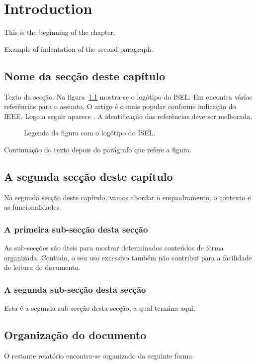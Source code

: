 %
%
\chapter{Introduction} \label{cap:intro}

This is the beginning of the chapter.

Example of indentation of the second paragraph.

%
%
\section{Nome da secção deste capítulo} \label{sec11}

Texto da secção. Na figura~\ref{fig:logotipo} mostra-se o logótipo do ISEL. Em \cite{wiki:bigdata2019} encontra várias referências para o assunto. O artigo \cite{6547630} é o mais popular conforme indicação do IEEE. Logo a seguir aparece \cite{6824752}. A identificação das referências deve ser melhorada.

\begin{figure}[h]
\begin{center}
\end{center}
\caption{Legenda da figura com o logótipo do ISEL.}\label{fig:logotipo}
\end{figure}

Continuação do texto depois do parágrafo que refere a figura.


%
%
\section{A segunda secção deste capítulo} \label{sec12}
Na segunda secção deste capítulo, vamos abordar o enquadramento,
o contexto e as funcionalidades.

%
%
\subsection{A primeira sub-secção desta secção} \label{sec121}
As sub-secções são úteis para mostrar determinados conteúdos de forma
organizada. Contudo, o seu uso excessivo também não contribui para a facilidade
de leitura do documento.

%
%
\subsection{A segunda sub-secção desta secção} \label{sec122}
Esta é a segunda sub-secção desta secção, a qual termina aqui.


%
%
\section{Organização do documento} \label{sec13}
O restante relatório encontra-se organizado da seguinte forma.